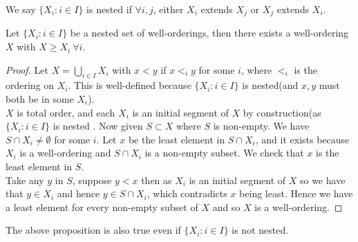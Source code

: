\begin{definition} We say $\{X_i: i \in I\}$ is nested if $\forall i,j$,
either $X_i$ extends $X_j$ or $X_j$ extends $X_i$.
\end{definition}
\begin{proposition} Let $\{X_i: i \in I\}$ be a nested set of well-orderings,
then there exists a well-ordering $X$ with $X \ge X_i ~\forall i$.
\end{proposition}
\begin{proof} Let $X=\bigcup_{i \in I}X_i$ with $x<y$ if $x<_i y$ for
some $i$, where $<_i$ is the ordering on $X_i$. This is well-defined
because $\{X_i: i \in I\}$ is nested(and $x,y$ must both be in some $X_i$).\\
$X$ is total order, and each $X_i$ is an initial segment of $X$ by
construction(as $\{X_i: i \in I\}$ is nested . Now given $S \subset X$
where $S$ is non-empty. We have $S \cap X_i \neq \emptyset$ for some $i$.
Let $x$ be the least element in $S \cap X_i$, and it exists because $X_i$
is a well-ordering and $S \cap X_i$ is a non-empty subset.
We check that $x$ is the least element in $S$.\\
Take any $y$ in $S$, suppose $y<x$ then as $X_i$ is an initial
segment of $X$ so we have that $y \in X_i$ and hence $y \in S \cap X_i$,
 which contradicts $x$ being least. Hence we have a least element
 for every non-empty subset of $X$ and so $X$ is a well-ordering.
\end{proof}
\begin{remark}The above proposition is also true even if $\{X_i: i \in I\}$ is not nested.
\end{remark}

